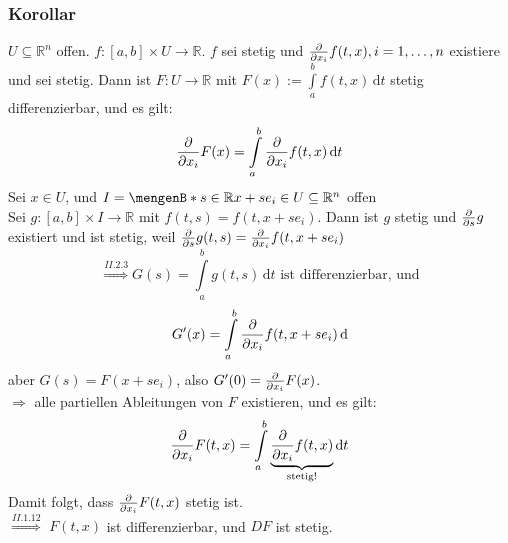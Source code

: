 \subsubsection{Korollar} %
\label{ssub:korollar}
$U \subseteq \mathbb{R}^n$ offen. $f:[a,b] \times U \to \mathbb{R}$. $f$ sei stetig und $\frac{{\partial }}{{\partial x_i}} f(t,x), i=1,\dots,n$ existiere und sei stetig. Dann ist $F:U \to \mathbb{R}$ mit $F(x):=\int\limits_{a}^{b}f(t,x) \,\mathrm{d}t$ stetig differenzierbar, und es gilt:
\[
	\frac{{\partial }}{{\partial x_i}} F(x)= \int\limits_{a}^{b}\frac{{\partial }}{{\partial x_i}} f(t,x) \,\mathrm{d}t
\]
 Sei $x \in U$, und $I = \set[s \in \mathbb{R}]{x+se_i \in U} \subseteq \mathbb{R}^n$ offen \\
Sei $g:[a,b] \times I \to \mathbb{R}$ mit $f(t,s)=f(t,x+se_i)$. Dann ist $g$ stetig und $\frac{{\partial }}{{\partial s}} g$ existiert und ist stetig, weil $\frac{{\partial }}{{\partial s}} g(t,s)= \frac{{\partial }}{{\partial x_i}} f(t,x+se_i)$
\[
	\stackrel{II.2.3}{\Rightarrow} G(s)= \int\limits_{a}^{b}g(t,s) \,\mathrm{d}t \text{ ist differenzierbar, und} 
\]
\[
	G'(x)= \int\limits_{a}^{b}\frac{{\partial }}{{\partial x_i}} f(t,x+se_i) \,\mathrm{d}
\]
aber $G(s)= F(x+se_i)$, also $G'(0)= \frac{{\partial }}{{\partial x_i}} F(x)$. \\
$\Rightarrow$ alle partiellen Ableitungen von $F$ existieren, und es gilt:
\[
	\frac{{\partial }}{{\partial x_i}} F(t,x)= \int\limits_{a}^{b} \underset{\text{stetig!}}{\underbrace{\frac{{\partial }}{{\partial x_i}} f(t,x)}} \,\mathrm{d}t
\]
Damit folgt, dass $\frac{{\partial }}{{\partial x_i}} F(t,x)$ stetig ist. \\
$ \stackrel{II.1.12}{\Rightarrow}$ $F(t,x)$ ist differenzierbar, und $DF$ ist stetig.
\bewende

